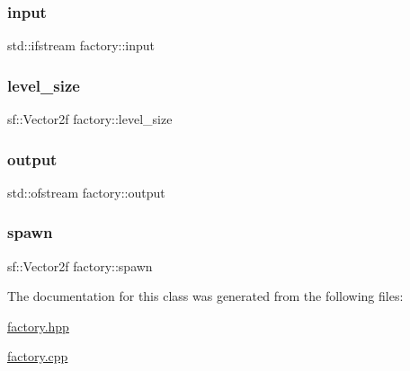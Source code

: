 \mbox{\label{classfactory_a9a874663e858e01c8ff372c070b8c19e}} 
\subsubsection{\texorpdfstring{input}{input}}
{\footnotesize\ttfamily std\+::ifstream factory\+::input\hspace{0.3cm}{\ttfamily [private]}}

\mbox{\label{classfactory_a29d1328317de4563aefb5c2f32f63424}} 
\subsubsection{\texorpdfstring{level\+\_\+size}{level\_size}}
{\footnotesize\ttfamily sf\+::\+Vector2f factory\+::level\+\_\+size\hspace{0.3cm}{\ttfamily [private]}}

\mbox{\label{classfactory_a0454b8bf0f45196f436ddf3febc422f3}} 
\subsubsection{\texorpdfstring{output}{output}}
{\footnotesize\ttfamily std\+::ofstream factory\+::output\hspace{0.3cm}{\ttfamily [private]}}

\mbox{\label{classfactory_a891028263226aa493299e51f767211a1}} 
\subsubsection{\texorpdfstring{spawn}{spawn}}
{\footnotesize\ttfamily sf\+::\+Vector2f factory\+::spawn\hspace{0.3cm}{\ttfamily [private]}}



The documentation for this class was generated from the following files\+:\begin{DoxyCompactItemize}
\item 
\hyperlink{factory_8hpp}{factory.\+hpp}\item 
\hyperlink{factory_8cpp}{factory.\+cpp}\end{DoxyCompactItemize}
